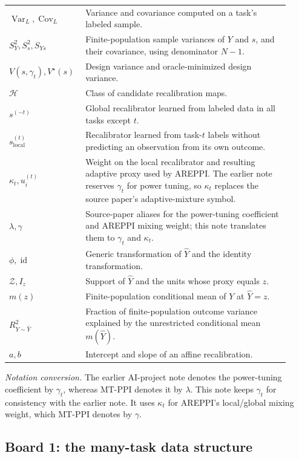 \documentclass[11pt]{article}
\newcommand{\Var}{\operatorname{Var}}
\newcommand{\Cov}{\operatorname{Cov}}
\begin{document}
\begin{longtable}{>{\raggedright\arraybackslash}p{0.22\linewidth}
                    >{\raggedright\arraybackslash}p{0.70\linewidth}}
  \(\Var_L,\Cov_L\) & Variance and covariance computed on a task's labeled
  sample. \\
  \(S_Y^2,S_s^2,S_{Ys}\) & Finite-population sample variances of \(Y\) and
  \(s\), and their covariance, using denominator \(N-1\). \\
  \(V(s,\gamma_t),V^\star(s)\) & Design variance and oracle-minimized design
  variance. \\
  \(\mathcal H\) & Class of candidate recalibration maps. \\
  \(s^{(-t)}\) & Global recalibrator learned from labeled data in all
  tasks except \(t\). \\
  \(s_{\mathrm{local}}^{(t)}\) & Recalibrator learned from task-\(t\)
  labels without predicting an observation from its own outcome. \\
  \(\kappa_t,u_i^{(t)}\) & Weight on the local recalibrator and resulting
  adaptive proxy used by AREPPI. The earlier note reserves \(\gamma_t\) for
  power tuning, so \(\kappa_t\) replaces the source paper's adaptive-mixture
  symbol. \\
  \(\lambda,\gamma\) & Source-paper aliases for the power-tuning coefficient
  and AREPPI mixing weight; this note translates them to \(\gamma_t\) and
  \(\kappa_t\). \\
  \(\phi,\operatorname{id}\) & Generic transformation of \(\widehat Y\) and the
  identity transformation. \\
  \(\mathcal Z,I_z\) & Support of \(\widehat Y\) and the units whose proxy equals
  \(z\). \\
  \(m(z)\) & Finite-population conditional mean of \(Y\) at
  \(\widehat Y=z\). \\
  \(R_{Y\sim\widehat Y}^2\) & Fraction of finite-population outcome variance
  explained by the unrestricted conditional mean \(m(\widehat Y)\). \\
  \(a,b\) & Intercept and slope of an affine recalibration. \\
  \bottomrule
  \end{longtable}
  
  \noindent\textit{Notation conversion.}
  The earlier AI-project note denotes the power-tuning coefficient by
  \(\gamma_t\), whereas MT-PPI denotes it by \(\lambda\). This note keeps
  \(\gamma_t\) for consistency with the earlier note. It uses \(\kappa_t\) for
  AREPPI's local/global mixing weight, which MT-PPI denotes by \(\gamma\).
  
  \subsection*{Board 1: the many-task data structure}
  
\end{document}
